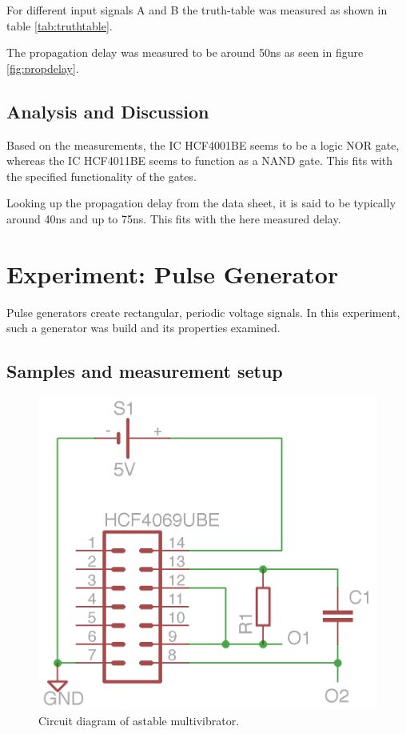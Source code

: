 \documentclass[journal]{IEEEtran}
\begin{document}
For different input signals A and B the truth-table was measured as
shown in table \ref{tab:truthtable}.

The propagation delay was measured to be around 50ns as seen in figure
\ref{fig:propdelay}.

\subsection{Analysis and Discussion}

Based on the measurements, the IC HCF4001BE seems to be a logic NOR gate,
whereas the IC HCF4011BE seems to function as a NAND gate. This fits with the
specified functionality of the gates.

Looking up the propagation delay from the data sheet, it is said to be typically
around 40ns and up to 75ns. This fits with the here measured delay.

\section{Experiment: Pulse Generator}

Pulse generators create rectangular, periodic voltage signals. In
this experiment, such a generator was build and its properties examined. 

\subsection{Samples and measurement setup}

\begin{figure}[h!]
  \centering
   \includegraphics[]{boards/astabil_multivibrator.png}
   \caption{Circuit diagram of astable multivibrator.}
   \label{fig:am_board}
\end{figure}
\end{document}
